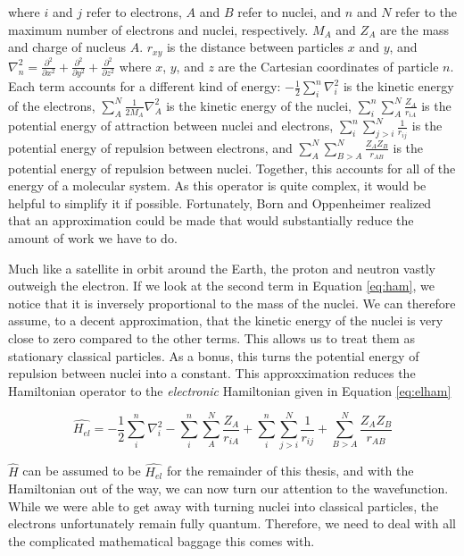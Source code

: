 where $i$ and $j$ refer to electrons, $A$ and $B$ refer to nuclei, and $n$ and $N$ refer to the maximum number of electrons and nuclei, respectively. $M_{A}$ and $Z_{A}$ are the mass and charge of nucleus $A$. $r_{xy}$ is the distance between particles $x$ and $y$, and $\nabla^{2}_{n}=\frac{\partial^{2}}{\partial x^{2}}+\frac{\partial^{2}}{\partial y^{2}}+\frac{\partial^{2}}{\partial z^{2}}$ where $x$, $y$, and $z$ are the Cartesian coordinates of particle $n$. Each term accounts for a different kind of energy: $-\frac{1}{2}\sum^{n}_{i}\nabla^{2}_{i}$ is the kinetic energy of the electrons, $\sum^{N}_{A}\frac{1}{2M_{A}}\nabla^{2}_{A}$ is the kinetic energy of the nuclei, $\sum^{n}_{i}\sum^{N}_{A}\frac{Z_{A}}{r_{iA}}$ is the potential energy of attraction between nuclei and electrons, $\sum^{n}_{i}\sum^{N}_{j>i}\frac{1}{r_{ij}} $ is the potential energy of repulsion between electrons, and $\sum^{N}_{A}\sum^{N}_{B>A}\frac{Z_{A}Z_{B}}{r_{AB}}$ is the potential energy of repulsion between nuclei. Together, this accounts for all of the energy of a molecular system. As this operator is quite complex, it would be helpful to simplify it if possible. Fortunately, Born and Oppenheimer\cite{1927AnP...389..457B} realized that an approximation could be made that would substantially reduce the amount of work we have to do.

Much like a satellite in orbit around the Earth, the proton and neutron vastly outweigh the electron. If we look at the second term in Equation \ref{eq:ham}, we notice that it is inversely proportional to the mass of the nuclei. We can therefore assume, to a decent approximation, that the kinetic energy of the nuclei is very close to zero compared to the other terms. This allows us to treat them as stationary classical particles. As a bonus, this turns the potential energy of repulsion between nuclei into a constant. This approxximation reduces the Hamiltonian operator to the \textit{electronic} Hamiltonian given in Equation \ref{eq:elham}

\begin{equation}
\label{eq:elham}
\hat{H_{el}} = -\frac{1}{2}\sum^{n}_{i}\nabla^{2}_{i}  - \sum^{n}_{i}\sum^{N}_{A}\frac{Z_{A}}{r_{iA}} + \sum^{n}_{i}\sum^{N}_{j>i}\frac{1}{r_{ij}} + \sum^{N}_{B>A}\frac{Z_{A}Z_{B}}{r_{AB}}
\end{equation} 

$\hat{H}$ can be assumed to be $\hat{H_{el}}$ for the remainder of this thesis, and with the Hamiltonian out of the way, we can now turn our attention to the wavefunction. While we were able to get away with turning nuclei into classical particles, the electrons unfortunately remain fully quantum. Therefore, we need to deal with all the complicated mathematical baggage this comes with.

